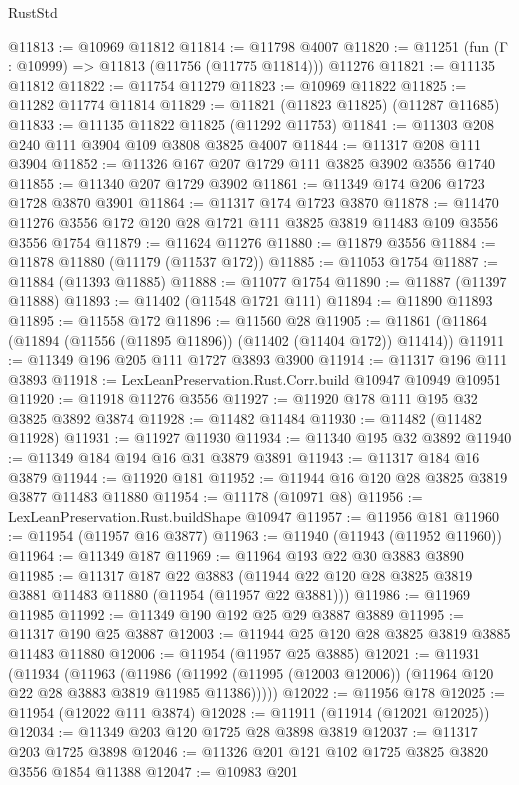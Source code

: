 \begin{lexlean}{RustStd}
\begin{coremodule}
@11813 := @10969 @11812
@11814 := @11798 @4007
@11820 := @11251 (fun (Γ : @10999) => @11813 (@11756 (@11775 @11814))) @11276
@11821 := @11135 @11812
@11822 := @11754 @11279
@11823 := @10969 @11822
@11825 := @11282 @11774 @11814
@11829 := @11821 (@11823 @11825) (@11287 @11685)
@11833 := @11135 @11822 @11825 (@11292 @11753)
@11841 := @11303 @208 @240 @111 @3904 @109 @3808 @3825 @4007
@11844 := @11317 @208 @111 @3904
@11852 := @11326 @167 @207 @1729 @111 @3825 @3902 @3556 @1740
@11855 := @11340 @207 @1729 @3902
@11861 := @11349 @174 @206 @1723 @1728 @3870 @3901
@11864 := @11317 @174 @1723 @3870
@11878 := @11470 @11276 @3556 @172 @120 @28 @1721 @111 @3825 @3819 @11483 @109 @3556 @3556 @1754
@11879 := @11624 @11276
@11880 := @11879 @3556
@11884 := @11878 @11880 (@11179 (@11537 @172))
@11885 := @11053 @1754
@11887 := @11884 (@11393 @11885)
@11888 := @11077 @1754
@11890 := @11887 (@11397 @11888)
@11893 := @11402 (@11548 @1721 @111)
@11894 := @11890 @11893
@11895 := @11558 @172
@11896 := @11560 @28
@11905 := @11861 (@11864 (@11894 (@11556 (@11895 @11896)) (@11402 (@11404 @172)) @11414))
@11911 := @11349 @196 @205 @111 @1727 @3893 @3900
@11914 := @11317 @196 @111 @3893
@11918 := LexLeanPreservation.Rust.Corr.build @10947 @10949 @10951
@11920 := @11918 @11276 @3556
@11927 := @11920 @178 @111 @195 @32 @3825 @3892 @3874
@11928 := @11482 @11484
@11930 := @11482 (@11482 @11928)
@11931 := @11927 @11930
@11934 := @11340 @195 @32 @3892
@11940 := @11349 @184 @194 @16 @31 @3879 @3891
@11943 := @11317 @184 @16 @3879
@11944 := @11920 @181
@11952 := @11944 @16 @120 @28 @3825 @3819 @3877 @11483 @11880
@11954 := @11178 (@10971 @8)
@11956 := LexLeanPreservation.Rust.buildShape @10947
@11957 := @11956 @181
@11960 := @11954 (@11957 @16 @3877)
@11963 := @11940 (@11943 (@11952 @11960))
@11964 := @11349 @187
@11969 := @11964 @193 @22 @30 @3883 @3890
@11985 := @11317
    @187
    @22
    @3883
    (@11944 @22 @120 @28 @3825 @3819 @3881 @11483 @11880 (@11954 (@11957 @22 @3881)))
@11986 := @11969 @11985
@11992 := @11349 @190 @192 @25 @29 @3887 @3889
@11995 := @11317 @190 @25 @3887
@12003 := @11944 @25 @120 @28 @3825 @3819 @3885 @11483 @11880
@12006 := @11954 (@11957 @25 @3885)
@12021 := @11931
    (@11934
      (@11963
        (@11986 (@11992 (@11995 (@12003 @12006)) (@11964 @120 @22 @28 @3883 @3819 @11985 @11386)))))
@12022 := @11956 @178
@12025 := @11954 (@12022 @111 @3874)
@12028 := @11911 (@11914 (@12021 @12025))
@12034 := @11349 @203 @120 @1725 @28 @3898 @3819
@12037 := @11317 @203 @1725 @3898
@12046 := @11326 @201 @121 @102 @1725 @3825 @3820 @3556 @1854 @11388
@12047 := @10983 @201

\end{coremodule}
\end{lexlean}
